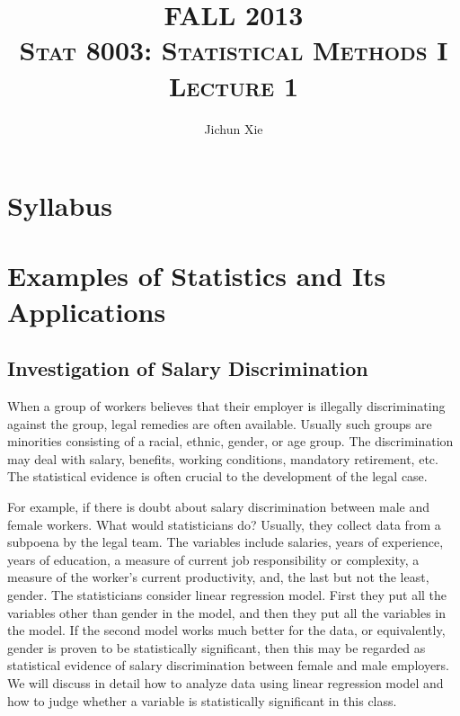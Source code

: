 \documentclass[12pt]{article}
\begin{document}
\title{\textsc{FALL 2013\\
Stat 8003: Statistical Methods I\\
Lecture 1}}
\author{Jichun Xie}
\date{}

\maketitle

\section{Syllabus}

\section{Examples of Statistics and Its Applications}

\subsection{Investigation of Salary Discrimination}

When a group of workers believes that their employer is illegally
discriminating against the group, legal remedies are often
available. Usually such groups are minorities consisting of a racial,
ethnic, gender, or age group. The discrimination may deal with salary,
benefits, working conditions, mandatory retirement, etc. The
statistical evidence is often crucial to the development of the legal
case.

For example, if there is doubt about salary discrimination between
male and female workers. What would statisticians do? Usually, they
collect data from a subpoena by the legal team. The variables include
salaries, years of experience, years of education, a measure of
current job responsibility or complexity, a measure of the worker's
current productivity, and, the last but not the least, gender. The
statisticians consider linear regression model. First they put all the
variables other than gender in the model, and then they put all the
variables in the model. If the second model works much better for the
data, or equivalently, gender is proven to be statistically
significant, then this may be regarded as statistical evidence of
salary discrimination between female and male employers. We will
discuss in detail how to analyze data using linear regression model
and how to judge whether a variable is statistically significant in
this class.
\end{document}
